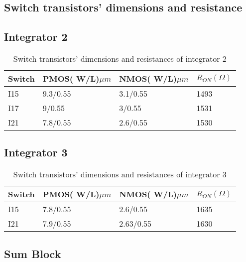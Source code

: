 \begin{appendices}

\chapter{Switch transistors' dimensions and resistance}
\label{app:on_resistance}

\section{Integrator 2}
\label{app:int_2_on}

\begin{table}[H]
\centering
\caption{Switch transistors' dimensions and resistances of integrator 2}
\label{R_on_2}
\begin{tabular}{|l|l|l|l|}
\hline
Switch & PMOS( W/L)$\mu m$ & NMOS( W/L)$\mu m$ & $R_{ON} (\Omega)$   \\ \hline
I15    & 9.3/0.55  & 3.1/0.55   & 1493 \\ \hline
I17     & 9/0.55  & 3/0.55   & 1531 \\ \hline
I21    & 7.8/0.55  & 2.6/0.55   & 1530 \\ \hline
\end{tabular}
\end{table}

\section{Integrator 3}
\label{app:R_on_3}
\begin{table}[H]
\centering
\caption{Switch transistors' dimensions and resistances of integrator 3}
\label{R_on_3}
\begin{tabular}{|l|l|l|l|}
\hline
Switch & PMOS( W/L)$\mu m$ & NMOS( W/L)$\mu m$ & $R_{ON} (\Omega)$   \\ \hline
I15    & 7.8/0.55  & 2.6/0.55   & 1635 \\ \hline
I21     & 7.9/0.55  & 2.63/0.55   & 1630 \\ \hline
\end{tabular}
\end{table}

\section{Sum Block}
\label{app:sum_block_on}


\end{appendices}
